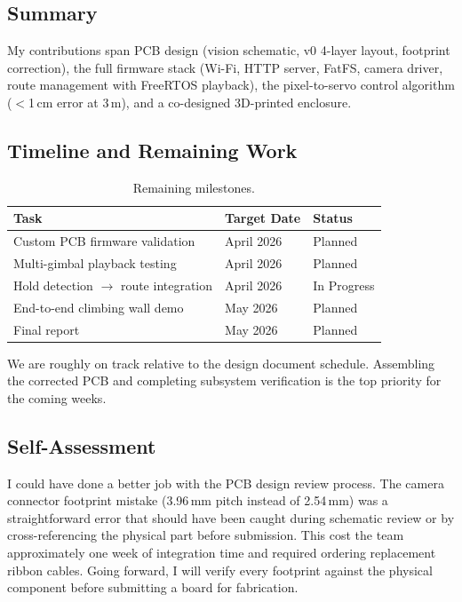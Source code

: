 \documentclass[12pt]{article}
\begin{document}
\subsection{Summary}

My contributions span PCB design (vision schematic, v0 4-layer layout,
footprint correction), the full firmware stack (Wi-Fi, HTTP server, FatFS,
camera driver, route management with FreeRTOS playback), the pixel-to-servo
control algorithm ($<$1\,cm error at 3\,m), and a co-designed 3D-printed
enclosure.

\subsection{Timeline and Remaining Work}

\begin{table}[H]
  \centering
  \caption{Remaining milestones.}
  \label{tab:timeline}
  \begin{tabular}{lll}
    \toprule
    Task & Target Date & Status \\
    \midrule
    Custom PCB firmware validation      & April 2026 & Planned \\
    Multi-gimbal playback testing       & April 2026 & Planned \\
    Hold detection $\to$ route integration & April 2026 & In Progress \\
    End-to-end climbing wall demo       & May 2026   & Planned \\
    Final report                        & May 2026   & Planned \\
    \bottomrule
  \end{tabular}
\end{table}

We are roughly on track relative to the design document schedule.
Assembling the corrected PCB and completing subsystem verification is the
top priority for the coming weeks.

\subsection{Self-Assessment}

I could have done a better job with the PCB design review process.  The
camera connector footprint mistake (3.96\,mm pitch instead of 2.54\,mm) was
a straightforward error that should have been caught during schematic review
or by cross-referencing the physical part before submission.  This cost
the team approximately one week of integration time and required ordering
replacement ribbon cables.  Going forward, I will verify every footprint
against the physical component before submitting a board for fabrication.
\end{document}
